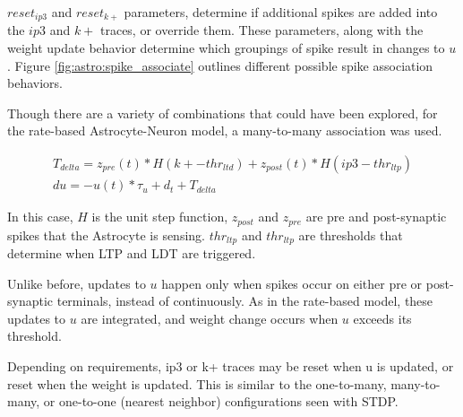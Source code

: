     $reset_{ip3}$ and $reset_{k+}$ parameters, determine if additional spikes
    are added into the $ip3$ and $k+$ traces, or override them. These
    parameters, along with the weight update behavior determine which groupings
    of spike result in changes to $u$. Figure \ref{fig:astro:spike_associate}
    outlines different possible spike association behaviors.


    Though there are a variety of combinations that could have been explored,
    for the rate-based Astrocyte-Neuron model, a many-to-many association was
    used.

    \begin{align}
      T_{delta} = z_{pre}(t) * H(k+ - thr_{ltd}) + z_{post}(t) * H(ip3 - thr_{ltp}) \\
      du = -u(t) * \tau_u + d_t + T_{delta} \label{eq:astro:temp-u}
    \end{align}

    In this case, $H$ is the unit step function, $z_{post}$ and $z_{pre}$ are
    pre and post-synaptic spikes that the Astrocyte is sensing. $thr_{ltp}$ and
    $thr_{ltp}$ are thresholds that determine when LTP and LDT are triggered.

    Unlike before, updates to $u$ happen only when spikes occur on either pre or
    post-synaptic terminals, instead of continuously. As in the rate-based
    model, these updates to $u$ are integrated, and weight change occurs when
    $u$ exceeds its threshold.

    Depending on requirements, ip3 or k+ traces may be reset when u is updated,
    or reset when the weight is updated. This is similar to the one-to-many,
    many-to-many, or one-to-one (nearest neighbor) configurations seen with
    STDP.


    
